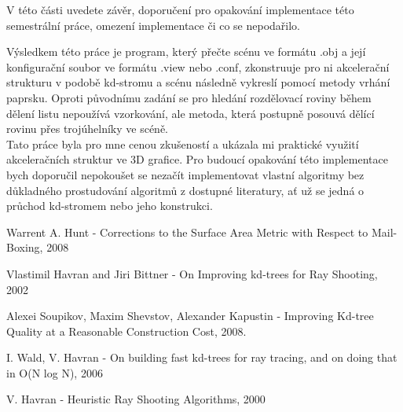 \documentclass[report,11pt]{elsarticle}
\begin{document}
V této části uvedete závěr, doporučení pro opakování implementace této
semestrální práce, omezení implementace či co se nepodařilo.

Výsledkem této práce je program, který přečte scénu ve formátu .obj a její konfigurační soubor ve formátu .view nebo .conf, zkonstruuje pro ni akcelerační strukturu v podobě kd-stromu a scénu následně vykreslí pomocí metody vrhání paprsku.
Oproti původnímu zadání se pro hledání rozdělovací roviny během dělení listu nepoužívá vzorkování, ale metoda, která postupně posouvá dělící rovinu přes trojúhelníky ve scéně.\\
Tato práce byla pro mne cenou zkušeností a ukázala mi praktické využití akceleračních struktur ve 3D grafice. Pro budoucí opakování této implementace bych doporučil nepokoušet se nezačít implementovat vlastní algoritmy bez důkladného prostudování algoritmů z dostupné literatury, ať už se jedná o průchod kd-stromem nebo jeho konstrukci.





%
%
%

\label{SEC:Reference}
\renewcommand\bibname{References}
\begin{thebibliography}{10}

Warrent A. Hunt - Corrections to the Surface Area Metric with Respect to Mail-Boxing, 2008

Vlastimil Havran and Jiri Bittner - On Improving kd-trees for Ray Shooting, 2002

Alexei Soupikov, Maxim Shevstov, Alexander Kapustin - Improving Kd-tree Quality at a Reasonable Construction Cost, 2008.

I. Wald, V. Havran - On building fast kd-trees for ray tracing, and on doing that in O(N log N), 2006

 V. Havran -  Heuristic Ray Shooting Algorithms, 2000


\end{thebibliography}
\end{document}

